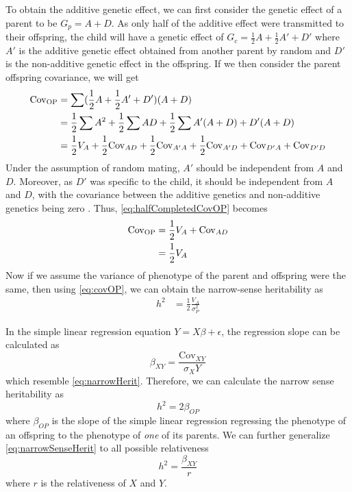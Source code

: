 	To obtain the additive genetic effect, we can first consider the genetic effect of a parent to be $G_p=A+D$. 
	As only half of the additive effect were transmitted to their offspring, the child will have a genetic effect of $G_c=\frac{1}{2}A+\frac{1}{2}A'+D'$ where $A'$ is the additive genetic effect obtained from another parent by random and $D'$ is the non-additive genetic effect in the offspring.
	If we then consider the parent offspring covariance, we will get
	\begin{align}
	\mathrm{Cov_{OP}}&= \sum(\frac{1}{2}A+\frac{1}{2}A'+D')(A+D)\notag\\
	&=\frac{1}{2}\sum A^2+\frac{1}{2}\sum AD + \frac{1}{2}\sum A'(A+D) +D'(A+D) \notag\\ 
	&=\frac{1}{2}V_A+ \frac{1}{2}\mathrm{Cov}_{AD} + \frac{1}{2}\mathrm{Cov}_{A'A} + \frac{1}{2}\mathrm{Cov}_{A'D} +\mathrm{Cov}_{D'A} +\mathrm{Cov}_{D'D}  
	\label{eq:halfCompletedCovOP}
	\end{align} 
	Under the assumption of random mating,  $A'$ should be independent from $A$ and $D$. 
	Moreover, as $D'$ was specific to the child, it should be independent from $A$ and $D$, with the covariance between the additive genetics and non-additive genetics being zero \citep{Falconer1996}.
	Thus, \cref{eq:halfCompletedCovOP} becomes
	\begin{align}
	\mathrm{Cov_{OP}} &= \frac{1}{2}V_A+\mathrm{Cov}_{AD} \notag\\
	&= \frac{1}{2}V_A
	\label{eq:covOP}
	\end{align}
	Now if we assume the variance of phenotype of the parent and offspring were the same, then using \cref{eq:covOP}, we can obtain the narrow-sense heritability as
	\begin{align}
	h^2 &= \frac{1}{2}\frac{V_A}{\sigma_P^2}
	\label{eq:narrowHerit}
	\end{align}

	In the simple linear regression equation $Y=X\beta+\epsilon$, the regression slope can be calculated as 
	\begin{equation}
	\beta_{XY} = \frac{\mathrm{Cov}_{XY}}{\sigma_{X}{Y}}
	\end{equation}
	which resemble \cref{eq:narrowHerit}. 
	Therefore,  we can calculate the narrow sense heritability as
	\begin{equation}
	h^2 = 2\beta_{OP}
	\label{eq:narrowSenseHerit}
	\end{equation}
	where $\beta_{OP}$ is the slope of the simple linear regression regressing the phenotype of an offspring to the phenotype of \emph{one} of its parents.
	We can further generalize \cref{eq:narrowSenseHerit} to all possible relativeness 
	\begin{equation}
	h^2=\frac{\beta_{XY}}{r}
	\label{eq:finalNarrow}
	\end{equation}
	where $r$ is the relativeness of $X$ and $Y$.
	
